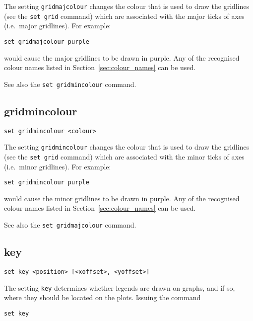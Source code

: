 The setting {\tt gridmajcolour} changes the colour that is used to draw the
gridlines (see the {\tt set grid} command) which are associated with the major
ticks of axes (i.e.\ major gridlines). For example:

\begin{verbatim}
set gridmajcolour purple
\end{verbatim}

\noindent would cause the major gridlines to be drawn in purple. Any of the
recognised colour names listed in Section~\ref{sec:colour_names} can be used.

See also the {\tt set gridmincolour} command.


\subsection{gridmincolour}

\begin{verbatim}
set gridmincolour <colour>
\end{verbatim}

The setting {\tt gridmincolour} changes the colour that is used to draw the
gridlines (see the {\tt set grid} command) which are associated with the minor
ticks of axes (i.e.\ minor gridlines). For example:

\begin{verbatim}
set gridmincolour purple
\end{verbatim}

\noindent would cause the minor gridlines to be drawn in purple. Any of the
recognised colour names listed in Section~\ref{sec:colour_names} can be used.

See also the {\tt set gridmajcolour} command.


\subsection{key}

\begin{verbatim}
set key <position> [<xoffset>, <yoffset>]
\end{verbatim}

The setting {\tt key} determines whether legends are drawn on graphs, and if
so, where they should be located on the plots. Issuing the command

\begin{verbatim}
set key
\end{verbatim}

